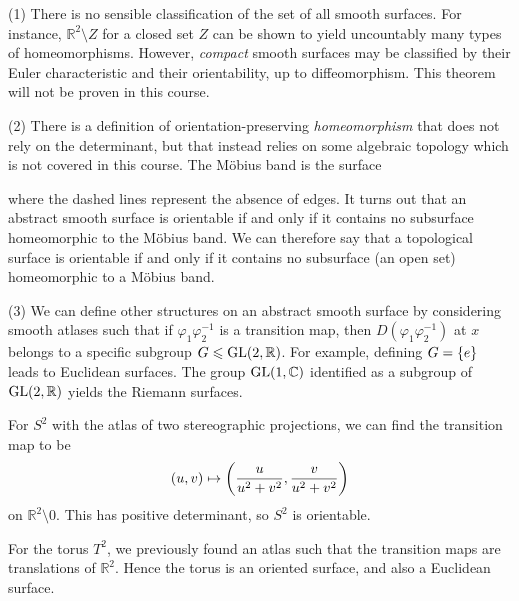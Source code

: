 \documentclass[a4paper]{article}
\begin{document}
\begin{remark}
	(1) There is no sensible classification of the set of all smooth surfaces.
	For instance, \( \mathbb R^2 \setminus Z \) for a closed set \( Z \) can be shown to yield uncountably many types of homeomorphisms.
	However, \textit{compact} smooth surfaces may be classified by their Euler characteristic and their orientability, up to diffeomorphism.
	This theorem will not be proven in this course.

	(2) There is a definition of orientation-preserving \textit{homeomorphism} that does not rely on the determinant, but that instead relies on some algebraic topology which is not covered in this course.
	The M\"obius band is the surface
	\begin{center}
	\end{center}
	where the dashed lines represent the absence of edges.
	It turns out that an abstract smooth surface is orientable if and only if it contains no subsurface homeomorphic to the M\"obius band.
	We can therefore say that a topological surface is orientable if and only if it contains no subsurface (an open set) homeomorphic to a M\"obius band.

	(3) We can define other structures on an abstract smooth surface by considering smooth atlases such that if \( \varphi_1 \varphi_2^{-1} \) is a transition map, then \( D (\varphi_1 \varphi_2^{-1}) \) at \( x \) belongs to a specific subgroup \( G \leqslant \mathrm{GL}(2, \mathbb R) \).
	For example, defining \( G = \qty{e} \) leads to Euclidean surfaces.
	The group \( \mathrm{GL}(1, \mathbb C) \) identified as a subgroup of \( \mathrm{GL}(2, \mathbb R) \) yields the Riemann surfaces.
\end{remark}

\begin{example}
	For \( S^2 \) with the atlas of two stereographic projections, we can find the transition map to be
	\[
		(u,v) \mapsto \qty(\frac{u}{u^2 + v^2}, \frac{v}{u^2 + v^2})
	\]
	on \( \mathbb R^2 \setminus \qty{0} \).
	This has positive determinant, so \( S^2 \) is orientable.

	For the torus \( T^2 \), we previously found an atlas such that the transition maps are translations of \( \mathbb R^2 \).
	Hence the torus is an oriented surface, and also a Euclidean surface.
\end{example}
\end{document}
